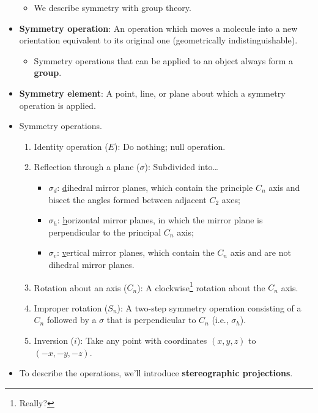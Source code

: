 \documentclass[../notes.tex]{subfiles}
\begin{document}
\begin{itemize}
    \begin{itemize}
        \item We describe symmetry with group theory.
    \end{itemize}
    \item \textbf{Symmetry operation}: An operation which moves a molecule into a new orientation equivalent to its original one (geometrically indistinguishable).
    \begin{itemize}
        \item Symmetry operations that can be applied to an object always form a \textbf{group}.
    \end{itemize}
    \item \textbf{Symmetry element}: A point, line, or plane about which a symmetry operation is applied.
    \item Symmetry operations.
    \begin{enumerate}
        \item Identity operation ($E$): Do nothing; null operation.
        \item Reflection through a plane ($\sigma$): Subdivided into\dots
        \begin{itemize}
            \item $\sigma_d$: \underline{d}ihedral mirror planes, which contain the principle $C_n$ axis and bisect the angles formed between adjacent $C_2$ axes;
            \item $\sigma_h$: \underline{h}orizontal mirror planes, in which the mirror plane is perpendicular to the principal $C_n$ axis;
            \item $\sigma_v$: \underline{v}ertical mirror planes, which contain the $C_n$ axis and are not dihedral mirror planes.
        \end{itemize}
        \item Rotation about an axis ($C_n$): A clockwise\footnote{Really?} rotation about the $C_n$ axis.
        \item Improper rotation ($S_n$): A two-step symmetry operation consisting of a $C_n$ followed by a $\sigma$ that is perpendicular to $C_n$ (i.e., $\sigma_h$).
        \item Inversion ($i$): Take any point with coordinates $(x,y,z)$ to $(-x,-y,-z)$.
    \end{enumerate}
    \item To describe the operations, we'll introduce \textbf{stereographic projections}.
    \begin{table}[h!]
        \centering

\end{table}
\end{itemize}
\end{document}
